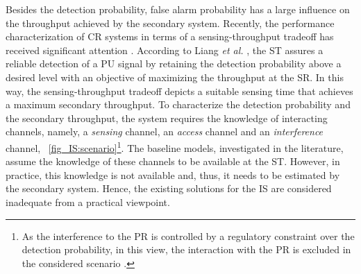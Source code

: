 

Besides the detection probability, false alarm probability has a large influence on the throughput achieved by the secondary system. %
Recently, the performance characterization of CR systems in terms of a sensing-throughput tradeoff has received significant attention \cite{Liang08, Juarez11, Sharkasi12, Pradhan15}. According to Liang \textit{et al.} \cite{Liang08}, the ST assures a reliable detection of a PU signal by retaining the detection probability above a desired level with an objective of maximizing the throughput at the SR. In this way, the sensing-throughput tradeoff depicts a suitable sensing time that achieves a maximum secondary throughput. To characterize the detection probability and the secondary throughput, the system requires the knowledge of interacting channels, namely, a \textit{sensing} channel, an \textit{access} channel and an \textit{interference} channel,  \figurename~\ref{fig_IS:scenario}\footnote{As the interference to the PR is controlled by a regulatory constraint over the detection probability, in this view, the interaction with the PR is excluded in the considered scenario \cite{Liang08}.}. The baseline models, investigated in the literature, assume the knowledge of these channels to be available at the ST. 
However, in practice, this knowledge is not available and, thus, it needs to be estimated by the secondary system. Hence, the existing solutions for the IS are considered inadequate from a practical viewpoint. 


